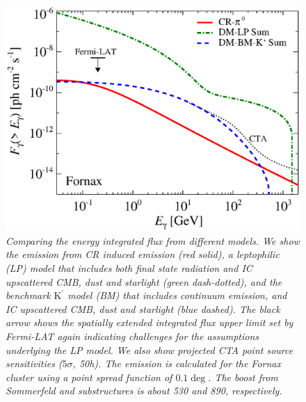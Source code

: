 \documentclass[10pt,aps,pra,reprint,amsmath,amsfonts,amssymb,showpacs,nofootinbib,floatfix]{revtex4-1}
\newcommand{\Fermi}{{\em Fermi}\xspace}
\newcommand{\rmn}{\mathrm}
\newcommand{\Kp}{\rmn{K}^\prime}
\begin{document}
\begin{figure}
 \includegraphics[width=0.99\columnwidth]{figures/flux.int.v14.0.1deg.1.6T.SubMass.SF700.IR2.noMW.woGal.eps}
 \caption{\it Comparing the energy integrated flux from different
   models. We show the emission from CR induced emission (red solid),
   a leptophilic (LP) model that includes both final state radiation
   and IC upscattered CMB, dust and starlight (green dash-dotted), and
   the benchmark $\Kp$ model (BM) that includes continuum emission,
   and IC upscattered CMB, dust and starlight (blue dashed). The black
   arrow shows the spatially extended integrated flux upper limit set
   by \Fermi-LAT again indicating challenges for the assumptions
   underlying the LP model. We also show projected CTA point source
   sensitivities ($5\sigma$, 50h). The emission is calculated for the
   Fornax cluster using a point spread function of $0.1\deg$. The
   boost from Sommerfeld and substructures is about 530 and 890,
   respectively.}
 \label{fig:flux_int}
\end{figure}
\end{document}
